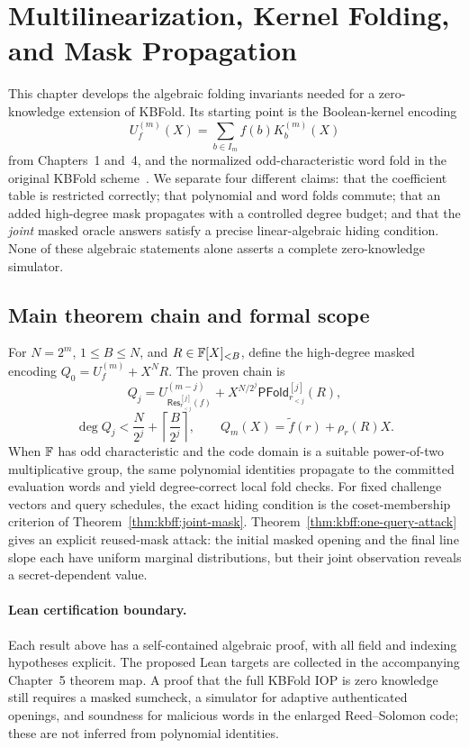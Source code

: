\section{Multilinearization, Kernel Folding, and Mask Propagation}\label{sec:kbfoldfold}

This chapter develops the algebraic folding invariants needed for a zero-knowledge extension of KBFold. Its starting point is the Boolean-kernel encoding
\[
 U_f^{(m)}(X)=\sum_{b\in I_m} f(b)K_b^{(m)}(X)
\]
from Chapters~1 and~4, and the normalized odd-characteristic word fold in the original KBFold scheme~\cite{MkhidaKBFold2026}.
We separate four different claims: that the coefficient table is restricted correctly; that polynomial and word folds commute; that an added high-degree mask propagates with a controlled degree budget; and that the \emph{joint} masked oracle answers satisfy a precise linear-algebraic hiding condition. None of these algebraic statements alone asserts a complete zero-knowledge simulator.









\subsection{Main theorem chain and formal scope}\label{sec:kbfoldfold:conclusion}
For $N=2^m$, $1\leq B\leq N$, and $R\in\mathbb{F}[X]_{<B}$, define the high-degree masked encoding
$Q_0=U_f^{(m)}+X^NR$.
The proven chain is
\[
 \boxed{
 Q_j=U_{\mathsf{Res}^{[j]}_{r_{<j}}(f)}^{(m-j)}
     +X^{N/2^j}\mathsf{PFold}^{[j]}_{r_{<j}}(R),}
\]
\[
 \boxed{\deg Q_j<
     \frac{N}{2^j}+\left\lceil\frac{B}{2^j}\right\rceil,}
 \qquad
 \boxed{Q_m(X)=\widetilde f(r)+\rho_r(R)X.}
\]
When $\mathbb{F}$ has odd characteristic and the code domain is a suitable power-of-two multiplicative group, the same polynomial identities propagate to the committed evaluation words and yield degree-correct local fold checks. For fixed challenge vectors and query schedules, the exact hiding condition is the coset-membership criterion of Theorem~\ref{thm:kbff:joint-mask}. Theorem~\ref{thm:kbff:one-query-attack} gives an explicit reused-mask attack: the initial masked opening and the final line slope each have uniform marginal distributions, but their joint observation reveals a secret-dependent value.

\paragraph{Lean certification boundary.}
Each result above has a self-contained algebraic proof, with all field and indexing hypotheses explicit. The proposed Lean targets are collected in the accompanying Chapter~5 theorem map. A proof that the full KBFold IOP is zero knowledge still requires a masked sumcheck, a simulator for adaptive authenticated openings, and soundness for malicious words in the enlarged Reed--Solomon code; these are not inferred from polynomial identities.
